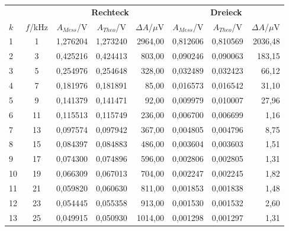 \newpage
\begin{center}
    \begin{tabular}{l | c | c c r | c c r}
        \multicolumn{2}{c}{} & \multicolumn{3}{c}{\textbf{Rechteck}} & \multicolumn{3}{c}{\textbf{Dreieck}}\\
        $k$ & $f$/kHz  &   $A_{Mess}$/V & $A_{Theo}$/V & $\Delta A$/$\mu$V  &   $A_{Mess}$/V & $A_{Theo}$/V & $\Delta A$/$\mu$V\\
        \hline
        1  &       1 &  1,276204 &  1,273240 & 2964,00 & 0,812606 &  0,810569 & 2036,48 \\
        2  &       3 &  0,425216 &  0,424413 &  803,00 & 0,090246 &  0,090063 &  183,15 \\
        3  &       5 &  0,254976 &  0,254648 &  328,00 & 0,032489 &  0,032423 &   66,12 \\
        4  &       7 &  0,181976 &  0,181891 &   85,00 & 0,016573 &  0,016542 &   31,10 \\
        5  &       9 &  0,141379 &  0,141471 &   92,00 & 0,009979 &  0,010007 &   27,96 \\
        6  &      11 &  0,115513 &  0,115749 &  236,00 & 0,006700 &  0,006699 &    1,16 \\
        7  &      13 &  0,097574 &  0,097942 &  367,00 & 0,004805 &  0,004796 &    8,75 \\
        8  &      15 &  0,084397 &  0,084883 &  486,00 & 0,003604 &  0,003603 &    1,51 \\
        9  &      17 &  0,074300 &  0,074896 &  596,00 & 0,002806 &  0,002805 &    1,31 \\
        10 &      19 &  0,066309 &  0,067013 &  704,00 & 0,002247 &  0,002245 &    1,82 \\
        11 &      21 &  0,059820 &  0,060630 &  811,00 & 0,001853 &  0,001838 &    1,48 \\
        12 &      23 &  0,054445 &  0,055358 &  913,00 & 0,001530 &  0,001532 &    2,60 \\
        13 &      25 &  0,049915 &  0,050930 & 1014,00 & 0,001298 &  0,001297 &    1,31 \\

\end{tabular}
\end{center}
